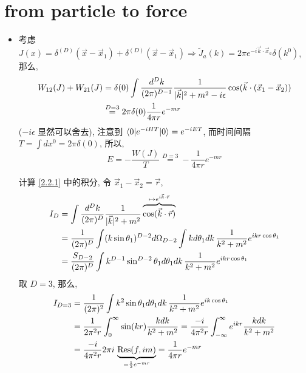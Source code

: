 \section{from particle to force}
\begin{itemize}
	\item 考虑 $J(x) = \delta^{(D)}(\vec{x} - \vec{x}_1) + \delta^{(D)}(\vec{x} - \vec{x}_1) \Longrightarrow \tilde{J}_a(k) = 2 \pi e^{- i \vec{k} \cdot \vec{x}_a} \delta(k^0)$, 那么,
	\begin{align}
		W_{1 2}(J) + W_{2 1}(J) &= \delta(0) \int \frac{d^D k}{(2 \pi)^{D - 1}} \frac{1}{|\vec{k}|^2 + m^2 - i \epsilon} \cos(\vec{k} \cdot (\vec{x}_1 - \vec{x}_2)) \notag \\
		&\overset{D = 3}{=} 2 \pi \delta(0) \frac{1}{4 \pi r} e^{- m r} \label{2.2.1}
	\end{align}
	($- i \epsilon$ 显然可以舍去), 注意到 $\braket{0 | e^{- i H T} | 0} = e^{- i E T}$, 而时间间隔 $T = \int dx^0 = 2 \pi \delta(0)$, 所以,
	\begin{equation}
		E = - \frac{W(J)}{T} \overset{D = 3}{=} - \frac{1}{4 \pi r} e^{- m r}
	\end{equation}
	
	\begin{tcolorbox}[title=calculation:]
		计算 \eqref{2.2.1} 中的积分, 令 $\vec{x}_1 - \vec{x}_2 = \vec{r}$,
		\begin{align}
			I_D &= \int \frac{d^D k}{(2 \pi)^D} \frac{1}{|\vec{k}|^2 + m^2} \overbrace{\cos(\vec{k} \cdot \vec{r})}^{\mapsto e^{i \vec{k} \cdot \vec{r}}} \notag \\
			&= \frac{1}{(2 \pi)^D} \int (k \sin \theta_1)^{D - 2} d\Omega_{D - 2} \int k d\theta_1 dk \, \frac{1}{k^2 + m^2} e^{i k r \cos \theta_1} \notag \\
			&= \frac{S_{D - 2}}{(2 \pi)^D} \int k^{D - 1} \sin^{D - 2} \theta_1 d\theta_1 dk \, \frac{1}{k^2 + m^2} e^{i k r \cos \theta_1}
		\end{align}
		取 $D = 3$, 那么,
		\begin{align}
			I_{D = 3} &= \frac{1}{(2 \pi)^2} \int k^2 \sin \theta_1 d\theta_1 dk \, \frac{1}{k^2 + m^2} e^{i k \cos \theta_1} \notag \\
			&= \frac{1}{2 \pi^2 r} \int_0^\infty \sin(k r) \frac{k dk}{k^2 + m^2} = \frac{- i}{4 \pi^2 r} \int_{- \infty}^\infty e^{i k r} \frac{k dk}{k^2 + m^2} \notag \\
			&= \frac{- i}{4 \pi^2 r} 2 \pi i \, \underbrace{\mathrm{Res}(f, i m)}_{= \frac{1}{2} e^{- m r}} = \frac{1}{4 \pi r} e^{- m r}
		\end{align}
	\end{tcolorbox}
\end{itemize}
